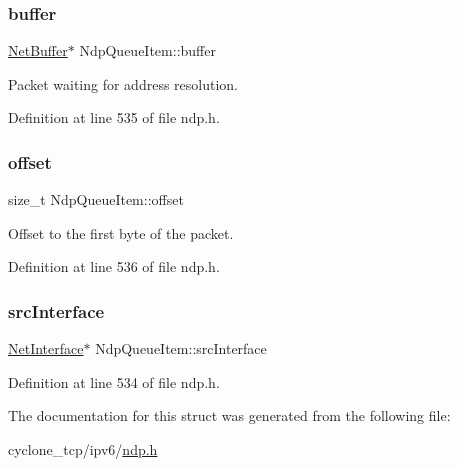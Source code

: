 \subsubsection{\texorpdfstring{buffer}{buffer}}
{\footnotesize\ttfamily \hyperlink{structNetBuffer}{Net\+Buffer}$\ast$ Ndp\+Queue\+Item\+::buffer}



Packet waiting for address resolution. 



Definition at line 535 of file ndp.\+h.

\mbox{\label{structNdpQueueItem_a35dd0104a5c90df40b99e85e84b2e194}} 
\subsubsection{\texorpdfstring{offset}{offset}}
{\footnotesize\ttfamily size\+\_\+t Ndp\+Queue\+Item\+::offset}



Offset to the first byte of the packet. 



Definition at line 536 of file ndp.\+h.

\mbox{\label{structNdpQueueItem_ae42a51fd4d60583ddc7a323c9e2c6863}} 
\subsubsection{\texorpdfstring{src\+Interface}{srcInterface}}
{\footnotesize\ttfamily \hyperlink{net_8h_a2234db8911a1148c9159979d8f5e0d6b}{Net\+Interface}$\ast$ Ndp\+Queue\+Item\+::src\+Interface}



Definition at line 534 of file ndp.\+h.



The documentation for this struct was generated from the following file\+:\begin{DoxyCompactItemize}
\item 
cyclone\+\_\+tcp/ipv6/\hyperlink{ndp_8h}{ndp.\+h}\end{DoxyCompactItemize}
